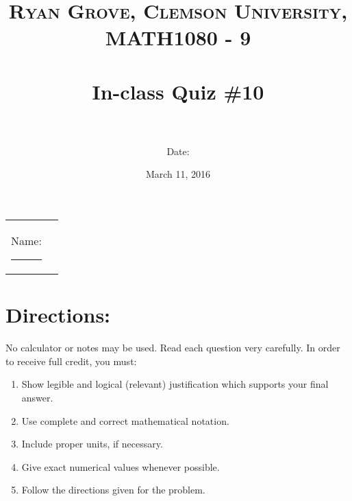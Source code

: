 \documentclass[paper=a4, fontsize=11pt]{scrartcl} %
\title{	
\normalfont \normalsize 
\textsc{Ryan Grove, Clemson University, MATH1080 - 9} \\ [25pt] %
\horrule{0.5pt} \\[0.4cm] %
\huge In-class Quiz \#10\\ %
\horrule{2pt} \\[0.5cm] %
}
\author{Date:} %
\date{\normalsize March 11, 2016} %
\numberwithin{equation}{section} %
\numberwithin{figure}{section} %
\numberwithin{table}{section} %
\begin{document}
\maketitle %

\begin{flushleft}
\begin{tabular}{l l}
Name: \rule{3.2in}{.01cm}  & {}%
\end{tabular}
\end{flushleft}


\section*{\textbf{Directions:}}

No calculator or notes may be used.  Read each question very carefully.  In order to receive full credit, you must:
\begin{enumerate}
\item Show legible and logical (relevant) justification which supports your final answer.
\item Use complete and correct mathematical notation.
\item Include proper units, if necessary.
\item Give exact numerical values whenever possible.
\item Follow the directions given for the problem.
\end{enumerate}
\vspace{.1in}

\newpage
\end{document}
